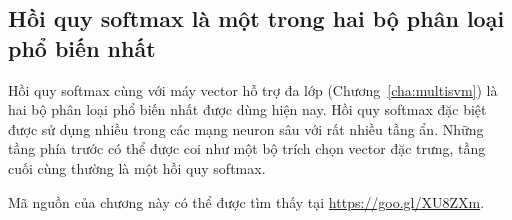 \subsection{Hồi quy softmax là một trong hai bộ phân loại phổ biến nhất}
Hồi quy softmax cùng với máy vector hỗ trợ đa lớp
(Chương~\ref{cha:multisvm}) là hai bộ phân loại phổ biến nhất được dùng hiện nay.
Hồi quy softmax đặc biệt được sử dụng nhiều trong các mạng neuron sâu với
rất nhiều tầng ẩn. Những tầng phía trước có thể được coi như một bộ trích chọn
vector đặc trưng, tầng cuối cùng thường là một hồi quy softmax.


Mã nguồn của chương này có thể được tìm thấy tại \url{https://goo.gl/XU8ZXm}.




